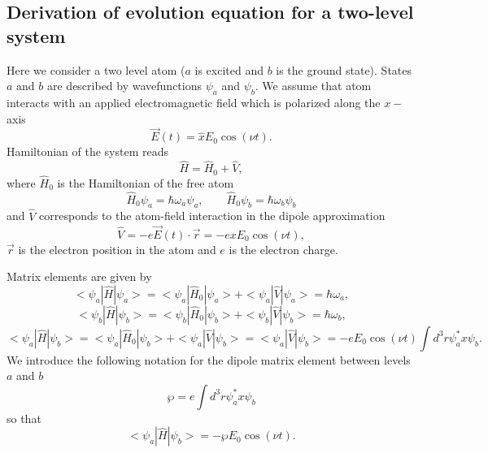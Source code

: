 \subsection{Derivation of evolution equation for a two-level system}

Here we consider a two level atom ($a$ is excited and $b$ is the ground
state). States $a$ and $b$ are described by wavefunctions $\psi _{a}$ and $%
\psi _{b}$. We assume that atom interacts with an applied electromagnetic
field which is polarized along the $x-$ axis%
\begin{equation}
  \vec{E}(t)=\hat{x}E_{0}\cos (\nu t).
\end{equation}%
Hamiltonian of the system reads
\begin{equation}
  \hat{H}=\hat{H}_{0}+\hat{V},
\end{equation}%
where $\hat{H}_{0}$ is the Hamiltonian of the free atom%
\begin{equation}
  \hat{H}_{0}\psi _{a}=\hbar \omega _{a}\psi _{a},\qquad \hat{H}_{0}\psi
  _{b}=\hbar \omega _{b}\psi _{b}
\end{equation}%
and $\hat{V}$ corresponds to the atom-field interaction in the dipole
approximation%
\begin{equation}
  \hat{V}=-e\vec{E}(t)\cdot \vec{r}=-exE_{0}\cos (\nu t),
\end{equation}%
$\vec{r}$ is the electron position in the atom and $e$ is the electron
charge.

Matrix elements are given by%
\begin{equation}
  <\psi _{a}|\hat{H}|\psi _{a}>=<\psi _{a}|\hat{H}_{0}|\psi _{a}>+<\psi _{a}|%
  \hat{V}|\psi _{a}>=\hbar \omega _{a},
\end{equation}%
\begin{equation}
  <\psi _{b}|\hat{H}|\psi _{b}>=<\psi _{b}|\hat{H}_{0}|\psi _{b}>+<\psi _{b}|%
  \hat{V}|\psi _{b}>=\hbar \omega _{b},
\end{equation}%
\begin{equation}
  <\psi _{a}|\hat{H}|\psi _{b}>=<\psi _{a}|\hat{H}_{0}|\psi _{b}>+<\psi _{a}|%
  \hat{V}|\psi _{b}>=<\psi _{a}|\hat{V}|\psi _{b}>=-eE_{0}\cos (\nu t)\int
  d^{3}r\psi _{a}^{\ast }x\psi _{b}.
\end{equation}%
We introduce the following notation for the dipole matrix element between
levels $a$ and $b$%
\begin{equation}
  \wp =e\int d^{3}r\psi _{a}^{\ast }x\psi _{b}
\end{equation}%
so that%
\begin{equation}
  <\psi _{a}|\hat{H}|\psi _{b}>=-\wp E_{0}\cos (\nu t).
\end{equation}

